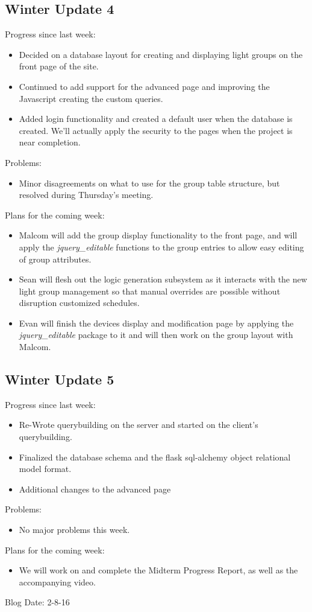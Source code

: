\subsection{Winter Update 4}
Progress since last week:
\begin{itemize}
   \item Decided on a database layout for creating and displaying light groups on the front page of the site.
   \item Continued to add support for the advanced page and improving the Javascript creating the custom queries.
   \item Added login functionality and created a default user when the database is created. We'll actually apply the security to the pages when the project is near completion.
\end{itemize}
Problems:
\begin{itemize}
   \item Minor disagreements on what to use for the group table structure, but resolved during Thursday's meeting.
\end{itemize}
Plans for the coming week:
\begin{itemize}
   \item Malcom will add the group display functionality to the front page, and will apply the \textit{jquery\_editable} functions to the group entries to allow easy editing of group attributes.
   \item Sean will flesh out the logic generation subsystem as it interacts with the new light group management so that manual overrides are possible without disruption customized schedules.
   \item Evan will finish the devices display and modification page by applying the \textit{jquery\_editable} package to it and will then work on the group layout with Malcom.
\end{itemize}
\subsection{Winter Update 5}
Progress since last week:
\begin{itemize}
   \item Re-Wrote querybuilding on the server and started on the client's querybuilding.
   \item Finalized the database schema and the flask sql-alchemy object relational model format.
   \item Additional changes to the advanced page
\end{itemize}
Problems:
\begin{itemize}
   \item No major problems this week.
\end{itemize}
Plans for the coming week:
\begin{itemize}
   \item We will work on and complete the Midterm Progress Report, as well as the accompanying video.
\end{itemize}
Blog Date: 2-8-16

